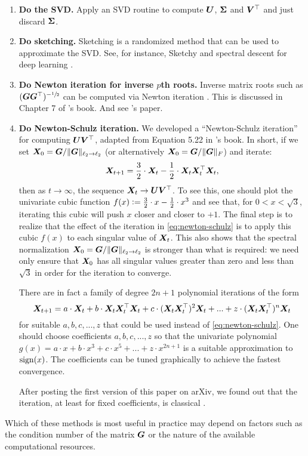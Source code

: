 \begin{enumerate}
    \item \textbf{Do the SVD.} Apply an SVD routine to compute ${\bm{U}}$, ${\bm{\Sigma}}$ and ${\bm{V}}^\top$ and just discard ${\bm{\Sigma}}$.
    \item \textbf{Do sketching.} Sketching is a randomized method \citep{Martinsson_Tropp_2020} that can be used to approximate the SVD. See, for instance, Sketchy \citep{sketchy} and spectral descent for deep learning \citep{spectral-descent}.
    \item \textbf{Do Newton iteration for inverse $p$th roots.} Inverse matrix roots such as $({\bm{G}}{\bm{G}}^\top)^{-\sfrac{1}{2}}$ can be computed via Newton iteration \citep{lakic}. This is discussed in Chapter 7 of \citet{higham}'s book. And see \citet{Anil2020ScalableSecondOrder}'s paper.
    \item \textbf{Do Newton-Schulz iteration.} We developed a ``Newton-Schulz iteration'' for computing ${\bm{U}}{\bm{V}}^\top$, adapted from Equation 5.22 in \citet{higham}'s book. In short, if we set ${\bm{X}}_0 = {\bm{G}} / \Vert {{\bm{G}}} \Vert_{\ell_2 \to \ell_2}$ (or alternatively ${\bm{X}}_0 = {\bm{G}} / \Vert {{\bm{G}}} \Vert_F$) and iterate:
    \begin{equation}\label{eq:newton-schulz}
        {\bm{X}}_{t+1} = \frac{3}{2} \cdot {\bm{X}}_t - \frac{1}{2} \cdot {\bm{X}}_t {\bm{X}}_t^\top {\bm{X}}_t,
    \end{equation}
    then as $t\to\infty$, the sequence ${\bm{X}}_t \to {\bm{U}} {\bm{V}}^\top$. To see this, one should plot the univariate cubic function $f(x) \vcentcolon= \tfrac{3}{2} \cdot x - \tfrac{1}{2}\cdot x^3$ and see that, for $0 < x < \sqrt{3}$, iterating this cubic will push $x$ closer and closer to $+1$. The final step is to realize that the effect of the iteration in \cref{eq:newton-schulz} is to apply this cubic $f(x)$ to each singular value of ${\bm{X}}_t$. This also shows that the spectral normalization ${\bm{X}}_0 = {\bm{G}} / \Vert {{\bm{G}}} \Vert_{\ell_2 \to \ell_2}$ is stronger than what is required: we need only ensure that ${\bm{X}}_0$ has all singular values greater than zero and less than $\sqrt{3}$ in order for the iteration to converge.

    There are in fact a family of degree $2n+1$ polynomial iterations of the form
    \begin{equation}
    {\bm{X}}_{t+1} = a \cdot {\bm{X}}_t + b  \cdot {\bm{X}}_t {\bm{X}}_t^\top {\bm{X}}_t + c \cdot ({\bm{X}}_t {\bm{X}}_t^\top)^2 {\bm{X}}_t + ... + z \cdot ({\bm{X}}_t {\bm{X}}_t^\top)^n {\bm{X}}_t
    \end{equation}
    for suitable $a,b,c,...,z$ that could be used instead of \cref{eq:newton-schulz}. One should choose coefficients $a, b,c,...,z$ so that the univariate polynomial $g(x) = a \cdot x + b \cdot x^3 + c \cdot x^5 + ... + z\cdot x^{2n+1}$ is a suitable approximation to $\operatorname{sign}(x)$. The coefficients can be tuned graphically to achieve the fastest convergence.

    After posting the first version of this paper on arXiv, we found out that the iteration, at least for fixed coefficients, is classical \citep{kovarik1970iterative,bjoerck1971}.
\end{enumerate}
Which of these methods is most useful in practice may depend on factors such as the condition number of the matrix ${\bm{G}}$ or the nature of the available computational resources.

